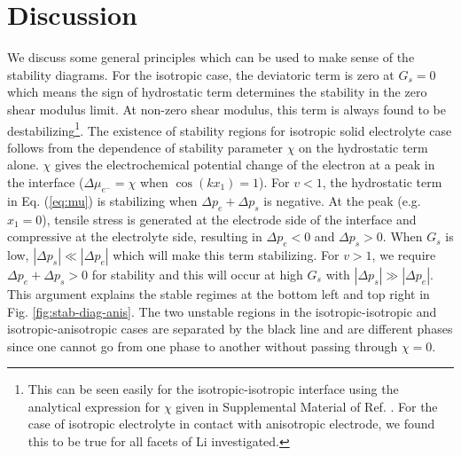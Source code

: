 \documentclass[%
reprint,
 amsmath,amssymb,
 aps,
 prb,
]{revtex4-1}
\begin{document}
\section{Discussion}\label{sec:disc}
We discuss some general principles which can be used to make sense of the stability diagrams. For the isotropic case, the deviatoric term is zero at $G_s=0$ which means the sign of hydrostatic term determines the stability in the zero shear modulus limit. At non-zero shear modulus, this term is always found to be destabilizing\footnote{This can be seen easily for the isotropic-isotropic interface using the analytical expression for $\chi$ given in Supplemental Material of Ref. . For the case of isotropic electrolyte in contact with anisotropic electrode, we found this to be true for all facets of Li investigated.}. The existence of stability regions for isotropic solid electrolyte case follows from the dependence of stability parameter $\chi$ on the hydrostatic term alone. $\chi$ gives the electrochemical potential change of the electron at a peak in the interface ($\Delta \mu_{e^-}=\chi$ when $\cos(kx_1)=1$). For $v<1$, the hydrostatic term in Eq. (\ref{eq:mu}) is stabilizing when $\Delta p_e + \Delta p_s$ is negative. At the peak (e.g. $x_1=0$), tensile stress is generated at the electrode side of the interface and compressive at the electrolyte side, resulting in $\Delta p_e<0$ and $\Delta p_s>0$. When $G_s$ is low, $|\Delta p_s|\ll |\Delta p_e|$ which will make this term stabilizing. For $v>1$, we require $\Delta p_e + \Delta p_s>0$ for stability and this will occur at high $G_s$ with $|\Delta p_s|\gg |\Delta p_e|$. This argument explains the stable regimes at the bottom left and top right in Fig. \ref{fig:stab-diag-anis}. The two unstable regions in the isotropic-isotropic and isotropic-anisotropic cases are separated by the black line and are different phases since one cannot go from one phase to another without passing through $\chi=0$.
\end{document}
